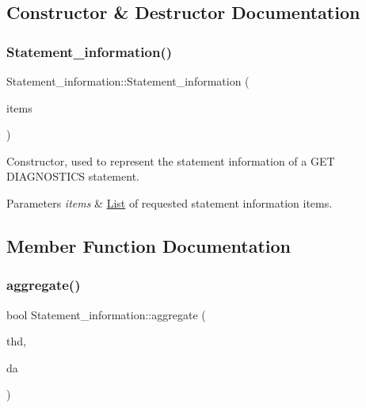 \subsection{Constructor \& Destructor Documentation}
\mbox{\label{classStatement__information_a1bc5bf81891a58793dcdbe084dd2ea7c}} 
\subsubsection{\texorpdfstring{Statement\+\_\+information()}{Statement\_information()}}
{\footnotesize\ttfamily Statement\+\_\+information\+::\+Statement\+\_\+information (\begin{DoxyParamCaption}\item[{\mbox{\hyperlink{classList}{List}}$<$ \mbox{\hyperlink{classStatement__information__item}{Statement\+\_\+information\+\_\+item}} $>$ $\ast$}]{items }\end{DoxyParamCaption})\hspace{0.3cm}{\ttfamily [inline]}}

Constructor, used to represent the statement information of a G\+ET D\+I\+A\+G\+N\+O\+S\+T\+I\+CS statement.


\begin{DoxyParams}{Parameters}
{\em items} & \mbox{\hyperlink{classList}{List}} of requested statement information items. \\
\hline
\end{DoxyParams}


\subsection{Member Function Documentation}
\mbox{\label{classStatement__information_ab059a9e174ffce90b78d541ec4f93455}} 
\subsubsection{\texorpdfstring{aggregate()}{aggregate()}}
{\footnotesize\ttfamily bool Statement\+\_\+information\+::aggregate (\begin{DoxyParamCaption}\item[{T\+HD $\ast$}]{thd,  }\item[{const \mbox{\hyperlink{classDiagnostics__area}{Diagnostics\+\_\+area}} $\ast$}]{da }\end{DoxyParamCaption})\hspace{0.3cm}{\ttfamily [virtual]}}

